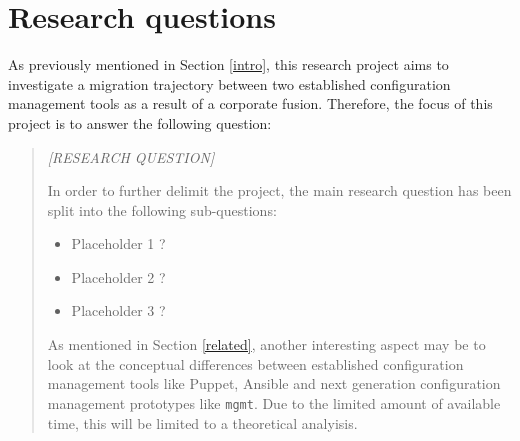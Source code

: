 \section{Research questions} \label{questions}
As previously mentioned in Section \ref{intro}, this research project aims to investigate a migration trajectory between two established configuration management tools as a result of a corporate fusion. Therefore, the focus of this project is to answer the following question:

\begin{quote}
\textit{[RESEARCH QUESTION]}

In order to further delimit the project, the main research question has been split into the following sub-questions:

\begin{itemize}
    \item Placeholder 1 ?
    \item Placeholder 2 ?
    \item Placeholder 3 ?
\end{itemize}

As mentioned in Section \ref{related}, another interesting aspect may be to look at the conceptual differences between established configuration management tools like Puppet, Ansible and next generation configuration management prototypes like \texttt{mgmt}. Due to the limited amount of available time, this will be limited to a theoretical analyisis. 

\end{quote}
